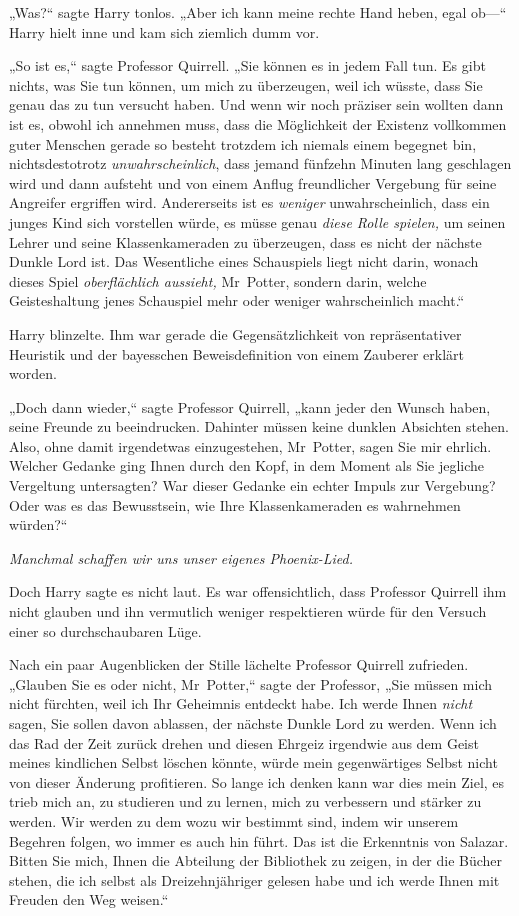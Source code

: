 {„Was?“ sagte Harry tonlos. „Aber ich kann meine rechte Hand heben, egal ob—“ Harry hielt inne und kam sich ziemlich dumm vor.

„So ist es,“ sagte Professor Quirrell. „Sie können es in jedem Fall tun. Es gibt nichts, was Sie tun können, um mich zu überzeugen, weil ich wüsste, dass Sie genau das zu tun versucht haben. Und wenn wir noch präziser sein wollten dann ist es, obwohl ich annehmen muss, dass die Möglichkeit der Existenz vollkommen guter Menschen gerade so besteht trotzdem ich niemals einem begegnet bin, nichtsdestotrotz \emph{unwahrscheinlich}, dass jemand fünfzehn Minuten lang geschlagen wird und dann aufsteht und von einem Anflug freundlicher Vergebung für seine Angreifer ergriffen wird. Andererseits ist es \emph{weniger} unwahrscheinlich, dass ein junges Kind sich vorstellen würde, es müsse genau \emph{diese Rolle spielen,} um seinen Lehrer und seine Klassenkameraden zu überzeugen, dass es nicht der nächste Dunkle Lord ist. Das Wesentliche eines Schauspiels liegt nicht darin, wonach dieses Spiel \emph{oberflächlich aussieht,} Mr~Potter, sondern darin, welche Geisteshaltung jenes Schauspiel mehr oder weniger wahrscheinlich macht.“

Harry blinzelte. Ihm war gerade die Gegensätzlichkeit von repräsentativer Heuristik und der bayesschen Beweisdefinition von einem Zauberer erklärt worden.

„Doch dann wieder,“ sagte Professor Quirrell, „kann jeder den Wunsch haben, seine Freunde zu beeindrucken. Dahinter müssen keine dunklen Absichten stehen. Also, ohne damit irgendetwas einzugestehen, Mr~Potter, sagen Sie mir ehrlich. Welcher Gedanke ging Ihnen durch den Kopf, in dem Moment als Sie jegliche Vergeltung untersagten? War dieser Gedanke ein echter Impuls zur Vergebung? Oder was es das Bewusstsein, wie Ihre Klassenkameraden es wahrnehmen würden?“

\emph{Manchmal schaffen wir uns unser eigenes Phoenix-Lied.}

Doch Harry sagte es nicht laut. Es war offensichtlich, dass Professor Quirrell ihm nicht glauben und ihn vermutlich weniger respektieren würde für den Versuch einer so durchschaubaren Lüge.

Nach ein paar Augenblicken der Stille lächelte Professor Quirrell zufrieden. „Glauben Sie es oder nicht, Mr~Potter,“ sagte der Professor, „Sie müssen mich nicht fürchten, weil ich Ihr Geheimnis entdeckt habe. Ich werde Ihnen \emph{nicht} sagen, Sie sollen davon ablassen, der nächste Dunkle Lord zu werden. Wenn ich das Rad der Zeit zurück drehen und diesen Ehrgeiz irgendwie aus dem Geist meines kindlichen Selbst löschen könnte, würde mein gegenwärtiges Selbst nicht von dieser Änderung profitieren. So lange ich denken kann war dies mein Ziel, es trieb mich an, zu studieren und zu lernen, mich zu verbessern und stärker zu werden. Wir werden zu dem wozu wir bestimmt sind, indem wir unserem Begehren folgen, wo immer es auch hin führt. Das ist die Erkenntnis von Salazar. Bitten Sie mich, Ihnen die Abteilung der Bibliothek zu zeigen, in der die Bücher stehen, die ich selbst als Dreizehnjähriger gelesen habe und ich werde Ihnen mit Freuden den Weg weisen.“

}
